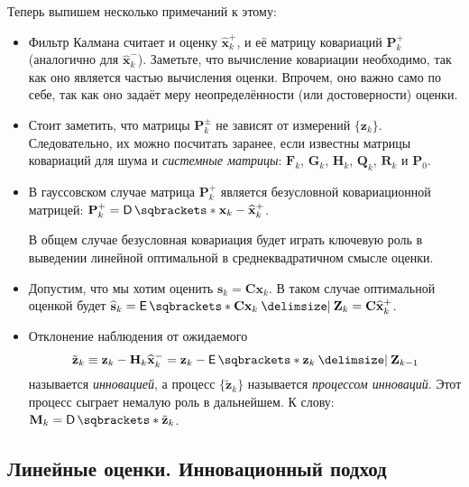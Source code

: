 Теперь выпишем несколько примечаний к этому:
\begin{itemize}
	\item Фильтр Калмана считает и оценку \(\hat{\mathbf{x}}_{k}^{+}\), и её 
	матрицу ковариаций \(\mathbf{P}_{k}^{+}\) (аналогично для 
	\(\hat{\mathbf{x}}_{k}^{-}\)). Заметьте, что вычисление ковариации 
	необходимо, так как оно является частью вычисления оценки. Впрочем, оно 
	важно само по себе, так как оно задаёт меру неопределённости (или 
	достоверности) оценки.
	
	\item Стоит заметить, что матрицы \(\mathbf{P}_{k}^{\pm}\) не зависят от 
	измерений \(\{\mathbf{z}_{k}\}\). Следовательно, их можно посчитать 
	заранее, если известны матрицы ковариаций для шума и \emph{системные 
	матрицы}: \(\mathbf{F}_{k}\), \(\mathbf{G}_{k}\), \(\mathbf{H}_{k}\), 
	\(\mathbf{Q}_{k}\), \(\mathbf{R}_{k}\) и \(\mathbf{P}_{0}\).
	
	\item В гауссовском случае матрица \(\mathbf{P}_{k}^{+}\) является 
	безусловной ковариационной матрицей: \(\mathbf{P}_{k}^{+} = 
	\D{\mathbf{x}_{k} - \hat{\mathbf{x}}_{k}^{+}}\).
	
	В общем случае безусловная ковариация будет играть ключевую роль в 
	выведении линейной оптимальной в среднеквадратичном смысле оценки.
	
	\item Допустим, что мы хотим оценить \(\mathbf{s}_{k} = 
	\mathbf{C}\mathbf{x}_{k}\). В таком случае оптимальной оценкой будет 
	\(\hat{\mathbf{s}}_{k} = \E{\mathbf{C}\mathbf{x}_{k} \given 
	\mathbf{Z}_{k}} = \mathbf{C}\hat{\mathbf{x}}_{k}^{+}\).

	\item Отклонение наблюдения от ожидаемого
	\[
		\tilde{\mathbf{z}}_{k} \equiv \mathbf{z}_{k} - 
		\mathbf{H}_{k}\hat{\mathbf{x}}_{k}^{-} = \mathbf{z}_{k} - 
		\E{\mathbf{z}_{k} \given \mathbf{Z}_{k - 1}}
	\]
	называется \emph{инновацией}, а процесс \(\{\tilde{\mathbf{z}}_{k}\}\) 
	называется \emph{процессом инноваций}. Этот процесс сыграет немалую роль в 
	дальнейшем. К слову: \(\mathbf{M}_{k} = \D{\tilde{\mathbf{z}}_{k}}\).
\end{itemize}

\subsection{Линейные оценки. Инновационный подход}

